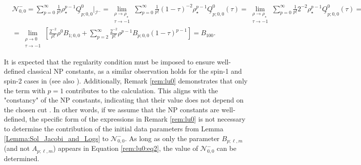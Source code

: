 \begin{align}
  &\mathcal{N}^{-}_{0,0}= \sum_{p=0}^{\infty} \frac{1}{p!}\rho^{p-1}_{\star}\underline{Q}^{0}_{p;0,0}|_{\mathscr{I}^{-}} = \lim_{\substack{\rho \to \rho_{\star} \\ \tau \to -1}} \sum_{p=0}^{\infty} \frac{1}{p !}(1-\tau)^{-2} \rho_{\star}^{p-1} \underline{Q}_{p; 0,0}^{0}(\tau) = \lim_{\substack{\rho \to \rho_{\star} \\ \tau \to -1}}\sum_{p=0}^{\infty} \frac{1}{p !} 2^{-2} \rho_{\star}^{p-1} \underline{Q}_{p; 0,0}^{0}(\tau) = \nonumber \\
  & = \lim_{\substack{\rho \to 0 \\ \tau \to -1}}\left[\frac{2^{-2}}{\rho !} \rho^{0} B_{1;0,0} +\sum_{p=2}^{\infty} \frac{2^{-2}}{p !} \rho^{p-1} B_{p;0,0}(1-\tau)^{p-1}\right] = B_{100}.
\end{align}

It is expected that the regularity condition must be imposed to ensure well-defined classical NP constants, as a similar observation holds for the spin-1 and spin-2 cases in \cite{GasVal20} (see also \cite{Val98, Val99a}). Additionally, Remark \ref{rem:lu0} demonstrates that only the term with $p=1$ contributes to the calculation. This aligns with the "constancy" of the NP constants, indicating that their value does not depend on the chosen cut \cite{NewPen68}. In other words, if we assume that the NP constants are well-defined, the specific form of the expressions in Remark \ref{rem:lu0} is not necessary to determine the contribution of the initial data parameters from Lemma \ref{Lemma:Sol_Jacobi_and_Logs} to $\mathcal{N}^{-}_{0,0}$. As long as only the parameter $B_{p;\ell,m}$ (and not $A_{p;\ell,m}$) appears in Equation \ref{rem:lu0:eq2}, the value of $\mathcal{N}^{-}_{0,0}$ can be determined.

